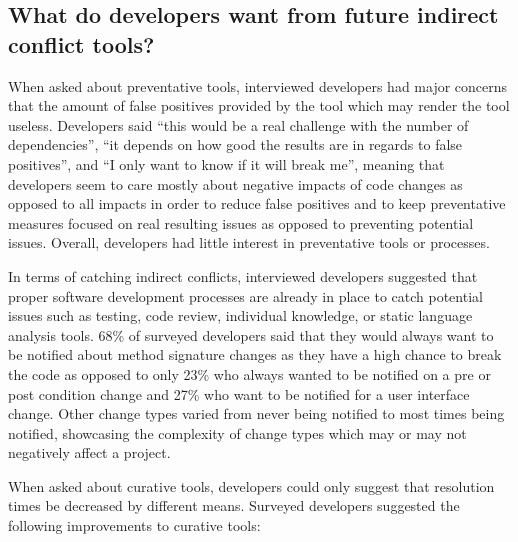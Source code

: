 \documentclass[conference]{IEEEtran}
\begin{document}
\subsection{What do developers want from future indirect conflict tools?}

When asked about preventative tools, interviewed developers had major concerns that the amount of false positives
provided by the tool which may render the tool useless. Developers said ``this would
be a real challenge with the number of dependencies'', ``it depends on how
good the results are in regards to false positives'', and ``I only want to know if it will break me'', meaning that
developers seem to care mostly about negative impacts of code changes as opposed to all impacts in order to reduce 
false positives and to keep preventative measures focused on real resulting issues as opposed to preventing potential
issues. Overall, developers had little interest in preventative tools or processes.

In terms of catching indirect conflicts, interviewed developers suggested that proper software development processes 
are already in place to catch potential issues such as testing, code review, 
individual knowledge, or static language analysis tools. 68\% of surveyed developers said that they would always
want to be notified about method signature changes as they have a high chance to break the code as opposed to only
23\% who always wanted to be notified on a pre or post condition change and 27\% who want to be notified for a user
interface change. Other change types varied from never being notified to most times being notified, showcasing the
complexity of change types which may or may not negatively affect a project.

When asked about curative tools, developers could only suggest that resolution times be decreased by different means.
Surveyed developers suggested the following improvements to curative tools: 
\end{document}
